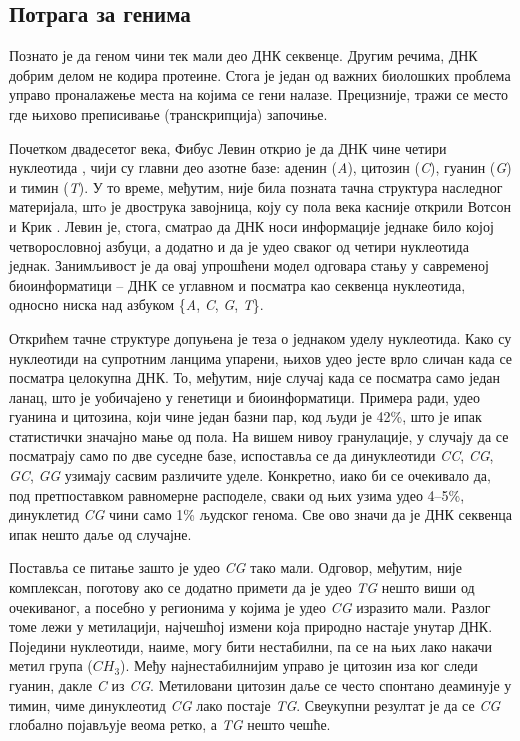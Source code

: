 \documentclass[12pt,oneside]{memoir}
\begin{document}
\begin{CJK}{UTF8}{ipxm}
\section{Потрага за генима}
Познато је да геном чини тек мали део ДНК секвенце. Другим речима, ДНК добрим делом не кодира протеине. Стога је један од важних биолошких проблема управо проналажење места на којима се гени налазе. Прецизније, тражи се место где њихово преписивање (транскрипција) започиње.

Почетком двадесетог века, Фибус Левин открио је да ДНК чине четири нуклеотида \cite{levene1910}, чији су главни део азотне базе: аденин (\textit{A}), цитозин (\textit{C}), гуанин (\textit{G}) и тимин (\textit{T}). У то време, међутим, није била позната тачна структура наследног материјала, штo је двострука завојница, коју су пола века касније открили Вотсон и Крик \cite{watson1953}. Левин је, стога, сматрао да ДНК носи информације једнаке било којој четворословној азбуци, а додатно и да је удео сваког од четири нуклеотида једнак. Занимљивост је да овај упрошћени модел одговара стању у савременој биоинформатици -- ДНК се углавном и посматра као секвенца нуклеотида, односно ниска над азбуком \{\textit{A}, \textit{C}, \textit{G}, \textit{T}\}.

Открићем тачне структуре допуњена је теза о једнаком уделу нуклеотида. Како су нуклеотиди на супротним ланцима упарени, њихов удео јесте врло сличан када се посматра целокупна ДНК. То, међутим, није случај када се посматра само један ланац, што је уобичајено у генетици и биоинформатици. Примера ради, удео гуанина и цитозина, који чине један базни пар, код људи је 42\%, што је ипак статистички значајно мање од пола. На вишем нивоу гранулације, у случају да се посматрају само по две суседне базе, испоставља се да динуклеотиди \textit{CC}, \textit{CG}, \textit{GC}, \textit{GG} узимају сасвим различите уделе. Конкретно, иако би се очекивало да, под претпоставком равномерне расподеле, сваки од њих узима удео 4--5\%, динуклетид \textit{CG} чини само 1\% људског генома. Све ово значи да је ДНК секвенца ипак нешто даље од случајне.

Поставља се питање зашто је удео \textit{CG} тако мали. Одговор, међутим, није комплексан, поготову ако се додатно примети да је удео \textit{TG} нешто виши од очекиваног, а посебно у регионима у којима је удео \textit{CG} изразито мали. Разлог томе лежи у метилацији, најчешћој измени која природно настаје унутар ДНК. Поједини нуклеотиди, наиме, могу бити нестабилни, па се на њих лако накачи метил група ($CH_3$). Међу најнестабилнијим управо је цитозин иза ког следи гуанин, дакле \textit{C} из \textit{CG}. Метиловани цитозин даље се често спонтано деаминује у тимин, чиме динуклеотид \textit{CG} лако постаје \textit{TG}. Свеукупни резултат је да се \textit{CG} глобално појављује веома ретко, а \textit{TG} нешто чешће.


\end{CJK}
\end{document}

